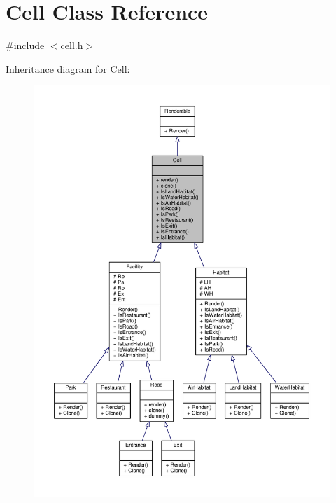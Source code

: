 \hypertarget{classCell}{}\section{Cell Class Reference}
\label{classCell}


{\ttfamily \#include $<$cell.\+h$>$}



Inheritance diagram for Cell\+:
\nopagebreak
\begin{figure}[H]
\begin{center}
\leavevmode
\includegraphics[width=350pt]{classCell__inherit__graph}
\end{center}
\end{figure}


